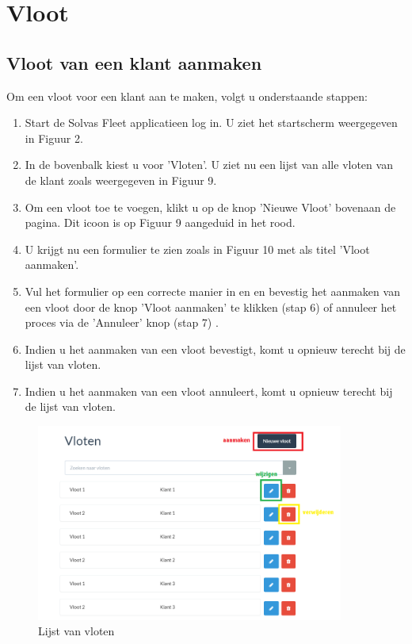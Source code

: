 \documentclass[11pt,openany]{article}
\begin{document}
\section{Vloot}
\subsection{Vloot van een klant aanmaken}
Om een vloot voor een klant aan te maken, volgt u onderstaande stappen:
\begin{enumerate}
	\item Start de Solvas Fleet applicatieen log in. U ziet het startscherm weergegeven in Figuur 2.
	\item In de bovenbalk kiest u voor 'Vloten'. U ziet nu een lijst van alle vloten van de klant zoals weergegeven in Figuur 9.
	\item Om een vloot toe te voegen, klikt u op de knop 'Nieuwe Vloot' bovenaan de pagina. Dit icoon is op Figuur 9 aangeduid in het rood.
	\item U krijgt nu een formulier te zien zoals in Figuur 10 met als titel 'Vloot aanmaken'.
	\item Vul het formulier op een correcte manier in en en bevestig het aanmaken van een vloot door de knop 'Vloot aanmaken' te klikken (stap 6) of annuleer het proces via de 'Annuleer' knop (stap 7) .
	\item Indien u het aanmaken van een vloot bevestigt, komt u opnieuw terecht bij de lijst van vloten.
	\item Indien u het aanmaken van een vloot annuleert, komt u opnieuw terecht bij de lijst van vloten. 
\end{enumerate}

\begin{figure}
	\centering
	\includegraphics[width=0.9\textwidth]{img/fig_i.png}
	\caption{Lijst van vloten}
\end{figure}
\end{document}
